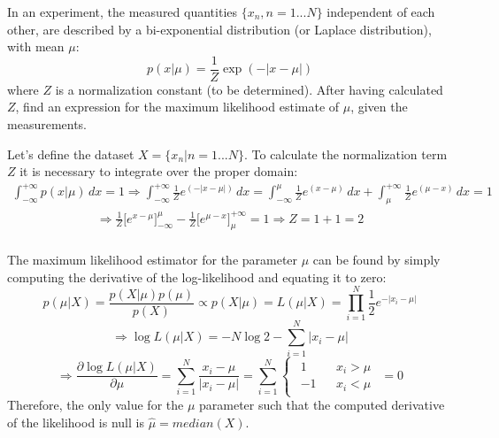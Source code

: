 \Exercise[number={4}]
In an experiment, the measured quantities \(\{x_n, n=1...N\}\) independent of
each other, are described by a bi-exponential distribution (or Laplace
distribution), with mean \(\mu\):
\[
    p(x|\mu) = \frac{1}{Z}\exp{(-|x-\mu|)}
\]
where \(Z\) is a normalization constant (to be determined).
After having calculated \(Z\), find an expression for the maximum
likelihood estimate of \(\mu\), given the measurements.

\Answer[number={4}]
Let's define the dataset \(X=\{x_n|n=1...N\}\).
To calculate the normalization term \(Z\) it is necessary to
integrate over the proper domain:
\begin{align*}
    \int_{-\infty}^{+\infty}p(x|\mu)\,dx = 1 \Rightarrow
    \int_{-\infty}^{+\infty}\frac{1}{Z}e^{(-|x-\mu|)}\,dx
    =
    \int_{-\infty}^{\mu}\frac{1}{Z}e^{(x-\mu)}\,dx
    +
    \int_{\mu}^{+\infty}\frac{1}{Z}e^{(\mu-x)}\,dx
    =
    1
\end{align*}
\begin{align*}
    \Rightarrow
    \frac{1}{Z}\biggl[e^{x-\mu}\biggr]_{-\infty}^{\mu} - \frac{1}{Z}\biggl[e^{\mu-x}\biggr]_{\mu}^{+\infty}=1
    \Rightarrow
    Z = 1+1 = 2
\end{align*}
\\
The maximum likelihood estimator for the parameter \(\mu\) can be found by
simply computing the derivative of the log-likelihood and equating it to
zero:
\[
    p(\mu|X)=\frac{p(X|\mu)p(\mu)}{p(X)} \propto p(X|\mu)=L(\mu|X)
    =
    \prod_{i=1}^{N}\frac{1}{2}e^{-|x_i-\mu|}
\]
\[
    \Rightarrow
    \log{L(\mu|X)}=-N\log{2}-\sum_{i=1}^{N}|x_i-\mu|
\]
\[
    \Rightarrow
    \frac{\partial{\log{L(\mu|X)}}}{\partial{\mu}}
    =
    \sum_{i=1}^{N}\frac{x_i-\mu}{|x_i-\mu|}
    =
    \sum_{i=1}^{N}
    \begin{cases}
        \begin{matrix}
            1 && x_i>\mu \\ -1 && x_i<\mu
        \end{matrix}
    \end{cases}
    =
    0
\]
Therefore, the only value for the \(\mu\) parameter such that the
computed derivative of the likelihood is null is \(\hat{\mu}=median(X)\).
